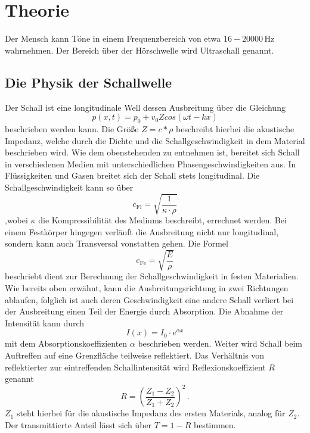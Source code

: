 \section{Theorie}
\label{sec:Theorie}


Der Mensch kann Töne in einem Frequenzbereich von etwa $16-20000\, \unit{\hertz}$ wahrnehmen. Der Bereich über der Hörschwelle wird 
Ultraschall genannt.

\subsection{Die Physik der Schallwelle}

Der Schall ist eine longitudinale Well dessen Ausbreitung über die Gleichung
\begin{equation*}
    p(x,t)=p_0+v_0Zcos(\omega t-kx)
\end{equation*}
beschrieben werden kann. Die Größe $Z= c*\rho$ beschreibt hierbei die akustische Impedanz, welche durch die Dichte und die Schallgeschwindigkeit in dem
Material beschrieben wird.
Wie dem obenstehenden zu entnehmen ist, bereitet sich Schall in verschiedenen Medien mit unterschiedlichen Phasengeschwindigkeiten aus.
In Flüssigkeiten und Gasen breitet sich der Schall stets longitudinal.
Die Schallgeschwindigkeit kann so über 
\begin{equation*}
    c_{\text{Fl}}=\sqrt{\frac{1}{\kappa \cdot \rho}}
\end{equation*}
,wobei $\kappa$ die Kompressibilität des Mediums beschreibt, errechnet werden.
Bei einem Festkörper hingegen verläuft die Ausbreitung nicht nur longitudinal, sondern kann auch Transversal vonstatten gehen.
Die Formel
\begin{equation*}
    c_{\text{Fe}}=\sqrt{\frac{E}{\rho}}
\end{equation*}
beschriebt dient zur Berechnung der Schallgeschwindigkeit in festen Materialien.
Wie bereits oben erwähnt, kann die Ausbreitungsrichtung in zwei Richtungen ablaufen, folglich ist auch deren Geschwindigkeit eine andere
Schall verliert bei der Ausbreitung einen Teil der Energie durch Absorption.
Die Abnahme der Intensität kann durch 
\begin{equation*}
    I(x)=I_0\cdot e^{\alpha x}
\end{equation*}
mit dem Absorptionskoeffizienten $\alpha$ beschrieben werden.
Weiter wird Schall beim Auftreffen auf eine Grenzfläche teilweise reflektiert.
Das Verhältnis von reflektierter zur eintreffenden Schallintensität wird Reflexionskoeffizient $R$ genannt
\begin{equation*}
    R=\left(\frac{Z_1-Z_2}{Z_1+Z_2}\right)^2\, .
\end{equation*}
$Z_1$ steht hierbei für die akustische Impedanz des ersten Materials, analog für $Z_2$.
Der transmittierte Anteil lässt sich über $T=1-R$ bestimmen.

